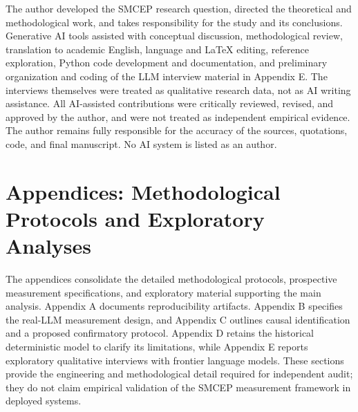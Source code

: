 \documentclass[11pt,a4paper]{article}
\begin{document}
The author developed the SMCEP research question, directed the theoretical and methodological work, and takes responsibility for the study and its conclusions. Generative AI tools assisted with conceptual discussion, methodological review, translation to academic English, language and LaTeX editing, reference exploration, Python code development and documentation, and preliminary organization and coding of the LLM interview material in Appendix E. The interviews themselves were treated as qualitative research data, not as AI writing assistance. All AI-assisted contributions were critically reviewed, revised, and approved by the author, and were not treated as independent empirical evidence. The author remains fully responsible for the accuracy of the sources, quotations, code, and final manuscript. No AI system is listed as an author.

\clearpage
\appendix
\renewcommand{\thesection}{\Alph{section}} 

\section*{Appendices: Methodological Protocols and Exploratory Analyses}

The appendices consolidate the detailed methodological protocols, prospective measurement specifications, and exploratory material supporting the main analysis. Appendix A documents reproducibility artifacts. Appendix B specifies the real-LLM measurement design, and Appendix C outlines causal identification and a proposed confirmatory protocol. Appendix D retains the historical deterministic model to clarify its limitations, while Appendix E reports exploratory qualitative interviews with frontier language models. These sections provide the engineering and methodological detail required for independent audit; they do not claim empirical validation of the SMCEP measurement framework in deployed systems.
\end{document}
